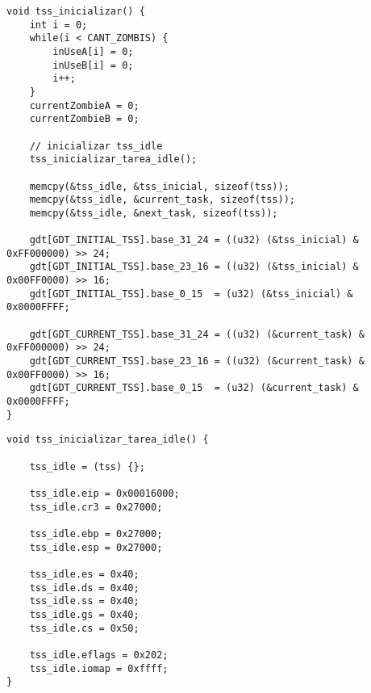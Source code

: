 \documentclass[a4paper]{article}
\begin{document}
\begin{codesnippet}
\begin{verbatim}
void tss_inicializar() {
    int i = 0;
    while(i < CANT_ZOMBIS) {
        inUseA[i] = 0;
        inUseB[i] = 0;
        i++;
    }
    currentZombieA = 0;
    currentZombieB = 0;

    // inicializar tss_idle
    tss_inicializar_tarea_idle();

    memcpy(&tss_idle, &tss_inicial, sizeof(tss));
    memcpy(&tss_idle, &current_task, sizeof(tss));
    memcpy(&tss_idle, &next_task, sizeof(tss));

    gdt[GDT_INITIAL_TSS].base_31_24 = ((u32) (&tss_inicial) & 0xFF000000) >> 24;
    gdt[GDT_INITIAL_TSS].base_23_16 = ((u32) (&tss_inicial) & 0x00FF0000) >> 16;
    gdt[GDT_INITIAL_TSS].base_0_15  = (u32) (&tss_inicial) & 0x0000FFFF;

    gdt[GDT_CURRENT_TSS].base_31_24 = ((u32) (&current_task) & 0xFF000000) >> 24;
    gdt[GDT_CURRENT_TSS].base_23_16 = ((u32) (&current_task) & 0x00FF0000) >> 16;
    gdt[GDT_CURRENT_TSS].base_0_15  = (u32) (&current_task) & 0x0000FFFF;
}
\end{verbatim}
\end{codesnippet}


\begin{codesnippet}
\begin{verbatim}
void tss_inicializar_tarea_idle() {

    tss_idle = (tss) {};

    tss_idle.eip = 0x00016000;
    tss_idle.cr3 = 0x27000;
    
    tss_idle.ebp = 0x27000;
    tss_idle.esp = 0x27000;

    tss_idle.es = 0x40;
    tss_idle.ds = 0x40;
    tss_idle.ss = 0x40;
    tss_idle.gs = 0x40;
    tss_idle.cs = 0x50;

    tss_idle.eflags = 0x202;
    tss_idle.iomap = 0xffff;
}
\end{verbatim}
\end{codesnippet}

\end{document}
